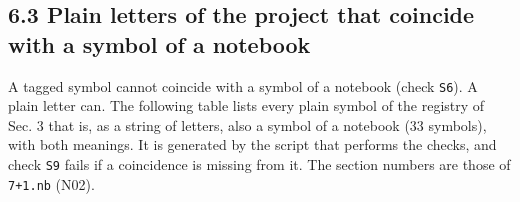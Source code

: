 \documentclass[
  10pt,
]{article}
\begin{document}
\hypertarget{plain-letters-of-the-project-that-coincide-with-a-symbol-of-a-notebook}{%
\subsection{6.3 Plain letters of the project that coincide with a symbol
of a
notebook}\label{plain-letters-of-the-project-that-coincide-with-a-symbol-of-a-notebook}}

A tagged symbol cannot coincide with a symbol of a notebook (check
\texttt{S6}). A plain letter can. The following table lists every plain
symbol of the registry of Sec. 3 that is, as a string of letters, also a
symbol of a notebook (33 symbols), with both meanings. It is generated
by the script that performs the checks, and check \texttt{S9} fails if a
coincidence is missing from it. The section numbers are those of
\texttt{7+1.nb} (N02).
\end{document}
